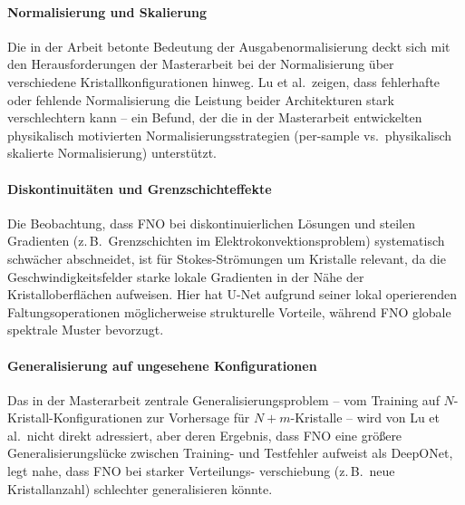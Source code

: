 \documentclass[a4paper,12pt]{article}
\begin{document}
\paragraph{Normalisierung und Skalierung} Die in der Arbeit betonte
Bedeutung der Ausgabenormalisierung deckt sich mit den Herausforderungen
der Masterarbeit bei der Normalisierung \"uber verschiedene
Kristallkonfigurationen hinweg. Lu et al.\ zeigen, dass fehlerhafte oder
fehlende Normalisierung die Leistung beider Architekturen stark
verschlechtern kann -- ein Befund, der die in der Masterarbeit entwickelten
physikalisch motivierten Normalisierungsstrategien (per-sample vs.\
physikalisch skalierte Normalisierung) unterst\"utzt.

\paragraph{Diskontinuit\"aten und Grenzschichteffekte} Die
Beobachtung, dass FNO bei diskontinuierlichen L\"osungen und steilen
Gradienten (z.\,B.\ Grenzschichten im Elektrokonvektionsproblem)
systematisch schw\"acher abschneidet, ist f\"ur Stokes-Str\"omungen um
Kristalle relevant, da die Geschwindigkeitsfelder starke lokale Gradienten
in der N\"ahe der Kristalloberfl\"achen aufweisen. Hier hat U-Net aufgrund
seiner lokal operierenden Faltungsoperationen m\"oglicherweise strukturelle
Vorteile, w\"ahrend FNO globale spektrale Muster bevorzugt.

\paragraph{Generalisierung auf ungesehene Konfigurationen} Das in der
Masterarbeit zentrale Generalisierungsproblem -- vom Training auf
$N$-Kristall-Konfigurationen zur Vorhersage f\"ur $N{+}m$-Kristalle --
wird von Lu et al.\ nicht direkt adressiert, aber deren Ergebnis, dass FNO
eine gr\"o\ss{}ere Generalisierungsl\"ucke zwischen Training- und Testfehler
aufweist als DeepONet, legt nahe, dass FNO bei starker Verteilungs-
verschiebung (z.\,B.\ neue Kristallanzahl) schlechter generalisieren k\"onnte.
\end{document}
